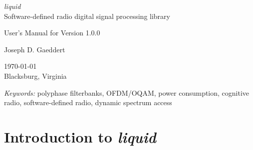 \documentclass[11pt,twoside]{article}
\newcommand{\liquid}{{\it liquid}}
\begin{document}



%
%
\thispagestyle{empty}
\begin{center}

{\huge\it liquid} \\
Software-defined radio digital signal processing library

\vfill

User's Manual for Version 1.0.0

\vfill

Joseph D. Gaeddert

\vfill

\today \\
Blacksburg, Virginia

\vfill

{\it Keywords:}
polyphase filterbanks,
OFDM/OQAM,
power consumption,
cognitive radio,
software-defined radio,
dynamic spectrum access
\\

\end{center}

\pagebreak
%
%
\tableofcontents
\pagebreak





%
%

\newpage
\part{Introduction to \liquid }
\label{part:intro}
\end{document}
